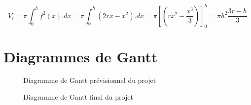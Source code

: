 		\begin{equation}
			V_i = \pi \int_0^h f^2(x).dx = \pi \int_0^h (2rx - x^2).dx = \pi \left[(rx^2 - \frac{x^3}{3})\right]_0^h = \pi h^2 \frac{3r - h}{3}
		\end{equation}

	\clearpage

	\section{Diagrammes de Gantt}

	\begin{figure}[H]
		\centering
        \label{fig:gantt_before}
        \caption{Diagramme de Gantt prévisionnel du projet}
	\end{figure}

	\begin{figure}[H]
		\centering
        \label{fig:gantt_after}
        \caption{Diagramme de Gantt final du projet}
	\end{figure}